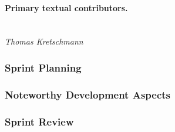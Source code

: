 \paragraph{Primary textual contributors.}
\mbox{}\\\emph{Thomas Kretschmann}

\subsubsection{Sprint Planning}


\subsubsection{Noteworthy Development Aspects}


\subsubsection{Sprint Review}


